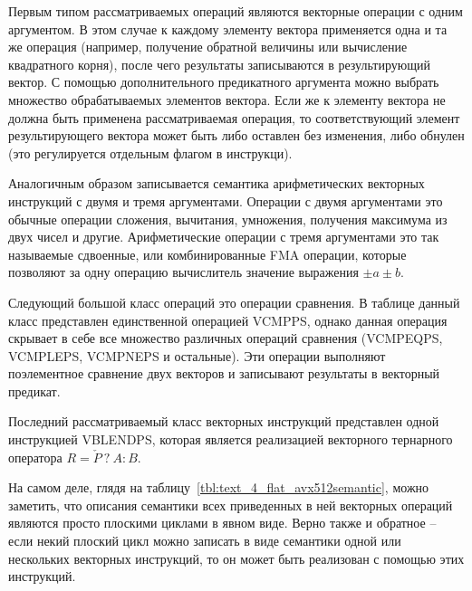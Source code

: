 Первым типом рассматриваемых операций являются векторные операции с одним аргументом.
В этом случае к каждому элементу вектора применяется одна и та же операция (например, получение обратной величины или вычисление квадратного корня), после чего результаты записываются в результирующий вектор.
С помощью дополнительного предикатного аргумента можно выбрать множество обрабатываемых элементов вектора.
Если же к элементу вектора не должна быть применена рассматриваемая операция, то соответствующий элемент результирующего вектора может быть либо оставлен без изменения, либо обнулен (это регулируется отдельным флагом в инструкци).

Аналогичным образом записывается семантика арифметических векторных инструкций с двумя и тремя аргументами.
Операции с двумя аргументами это обычные операции сложения, вычитания, умножения, получения максимума из двух чисел и другие.
Арифметические операции с тремя аргументами это так называемые сдвоенные, или комбинированные FMA операции, которые позволяют за одну операцию вычислитель значение выражения $\pm a \pm b$.

Следующий большой класс операций это операции сравнения.
В таблице данный класс представлен единственной операцией VCMPPS, однако данная операция скрывает в себе все множество различных операций сравнения (VCMPEQPS, VCMPLEPS, VCMPNEPS и остальные).
Эти операции выполняют поэлементное сравнение двух векторов и записывают результаты в векторный предикат.

Последний рассматриваемый класс векторных инструкций представлен одной инструкцией VBLENDPS, которая является реализацией векторного тернарного оператора $R = \check{P} \ ? \ A : B$.

На самом деле, глядя на таблицу~\ref{tbl:text_4_flat_avx512semantic}, можно заметить, что описания семантики всех приведенных в ней векторных операций являются просто плоскими циклами в явном виде.
Верно также и обратное -- если некий плоский цикл можно записать в виде семантики одной или нескольких векторных инструкций, то он может быть реализован с помощью этих инструкций.

